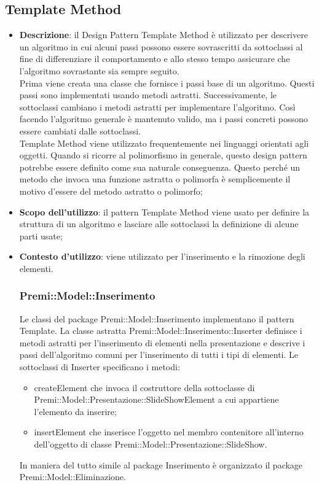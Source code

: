 {	\subsection{Template Method}{
		\begin{itemize}
			\item \textbf{Descrizione}: il Design Pattern Template Method è utilizzato per descrivere un algoritmo in cui alcuni passi possono essere sovrascritti da sottoclassi al fine di differenziare il comportamento e allo stesso tempo assicurare che l'algoritmo sovrastante sia sempre seguito.\\
			Prima viene creata una classe che fornisce i passi base di un algoritmo. Questi passi sono implementati usando metodi astratti. Successivamente, le sottoclassi cambiano i metodi astratti per implementare l'algoritmo. Così facendo l'algoritmo generale è mantenuto valido, ma i passi concreti possono essere cambiati dalle sottoclassi.\\
			Template Method viene utilizzato frequentemente nei linguaggi orientati agli oggetti. Quando si ricorre al polimorfismo in generale, questo design pattern potrebbe essere definito come sua naturale conseguenza. Questo perché un metodo che invoca una funzione astratta o polimorfa è semplicemente il motivo d'essere del metodo astratto o polimorfo;
			\item \textbf{Scopo dell’utilizzo}: il pattern Template Method viene usato per definire la struttura di un algoritmo e lasciare alle sottoclassi la definizione di alcune parti usate;
			\item \textbf{Contesto d’utilizzo}: viene utilizzato per l’inserimento e la rimozione degli elementi.
			\subsubsection{Premi::Model::Inserimento}{
				Le classi del package Premi::Model::Inserimento implementano il pattern Template. La classe astratta Premi::Model::Inserimento::Inserter definisce i metodi astratti per l'inserimento di elementi nella presentazione e descrive i passi dell'algoritmo comuni per l'inserimento di tutti i tipi di elementi.
				Le sottoclassi di Inserter specificano i metodi:
				\begin{itemize}
					\item createElement che invoca il costruttore della sottoclasse di Premi::Model::Presentazione::SlideShowElement a cui appartiene l'elemento da inserire;
					\item insertElement che inserisce l'oggetto nel membro contenitore all'interno dell'oggetto di classe Premi::Model::Presentazione::SlideShow.
				\end{itemize} 
			}
			In maniera del tutto simile al package Inserimento è organizzato il package Premi::Model::Eliminazione.
		\end{itemize}
	}
}
